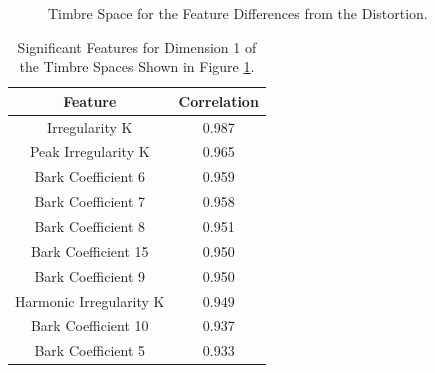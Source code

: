 		\begin{figure}[h!]
			\centering
			\qquad
			\caption{Timbre Space for the Feature Differences from the Distortion.}
			\label{fig:DistortionDifferenceMDSs}
		\end{figure}

		\begin{table}[h!]
			\centering
			\begin{tabular}{|c|c|}
				\hline
				\bf{Feature} & \bf{Correlation} \\
				\hline
				\hline
				Irregularity K & 0.987 \\
				\hline
				Peak Irregularity K & 0.965 \\
				\hline
				Bark Coefficient 6 & 0.959 \\
				\hline
				Bark Coefficient 7 & 0.958 \\
				\hline
				Bark Coefficient 8 & 0.951 \\
				\hline
				Bark Coefficient 15 & 0.950 \\
				\hline
				Bark Coefficient 9 & 0.950 \\
				\hline
				Harmonic Irregularity K & 0.949 \\
				\hline
				Bark Coefficient 10 & 0.937 \\
				\hline
				Bark Coefficient 5 & 0.933 \\
				\hline
			\end{tabular}
			\caption{Significant Features for Dimension 1 of the Timbre Spaces Shown in Figure 
				 \ref{fig:DistortionDifferenceMDSs}.}
			\label{tab:DistortionDifferenceFeatures}
		\end{table}

